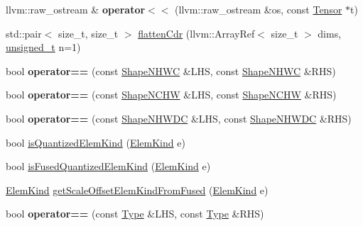 \begin{DoxyCompactItemize}
llvm\+::raw\+\_\+ostream \& {\bfseries operator$<$$<$} (llvm\+::raw\+\_\+ostream \&os, const \hyperlink{classglow_1_1_tensor}{Tensor} $\ast$t)
\item 
std\+::pair$<$ size\+\_\+t, size\+\_\+t $>$ \hyperlink{namespaceglow_a47d2c5f23a3db76b44bbf76e2d41f60d}{flatten\+Cdr} (llvm\+::\+Array\+Ref$<$ size\+\_\+t $>$ dims, \hyperlink{namespaceglow_a0ca574644e1e42ef193a9947fb4d8911}{unsigned\+\_\+t} n=1)
\item 
\mbox{\label{namespaceglow_aade8f76ee6a51f702ae0c3842b09f740}} 
bool {\bfseries operator==} (const \hyperlink{structglow_1_1_shape_n_h_w_c}{Shape\+N\+H\+WC} \&L\+HS, const \hyperlink{structglow_1_1_shape_n_h_w_c}{Shape\+N\+H\+WC} \&R\+HS)
\item 
\mbox{\label{namespaceglow_a8c9744bfd19e6cb92b7704a46eafe2e8}} 
bool {\bfseries operator==} (const \hyperlink{structglow_1_1_shape_n_c_h_w}{Shape\+N\+C\+HW} \&L\+HS, const \hyperlink{structglow_1_1_shape_n_c_h_w}{Shape\+N\+C\+HW} \&R\+HS)
\item 
\mbox{\label{namespaceglow_a652773bb012a43c21f460b9d110e1f63}} 
bool {\bfseries operator==} (const \hyperlink{structglow_1_1_shape_n_h_w_d_c}{Shape\+N\+H\+W\+DC} \&L\+HS, const \hyperlink{structglow_1_1_shape_n_h_w_d_c}{Shape\+N\+H\+W\+DC} \&R\+HS)
\item 
bool \hyperlink{namespaceglow_a67fc7f0b501763e06363d035e472238c}{is\+Quantized\+Elem\+Kind} (\hyperlink{namespaceglow_ab92e14a94329daf4083db670e95fbcdf}{Elem\+Kind} e)
\item 
bool \hyperlink{namespaceglow_aeea823a4b44883f04b3cd7ba5eebb9ef}{is\+Fused\+Quantized\+Elem\+Kind} (\hyperlink{namespaceglow_ab92e14a94329daf4083db670e95fbcdf}{Elem\+Kind} e)
\item 
\hyperlink{namespaceglow_ab92e14a94329daf4083db670e95fbcdf}{Elem\+Kind} \hyperlink{namespaceglow_aaee7b49ad6e84bdb1a42ac3e5bff797e}{get\+Scale\+Offset\+Elem\+Kind\+From\+Fused} (\hyperlink{namespaceglow_ab92e14a94329daf4083db670e95fbcdf}{Elem\+Kind} e)
\item 
\mbox{\label{namespaceglow_a9abd8ccc93a8963092c57a669d6035a0}} 
bool {\bfseries operator==} (const \hyperlink{structglow_1_1_type}{Type} \&L\+HS, const \hyperlink{structglow_1_1_type}{Type} \&R\+HS)
\item 
\mbox{\label{namespaceglow_a0e6e7356de0d3ed109bc3b95d9753d8d}} 

\end{DoxyCompactItemize}
